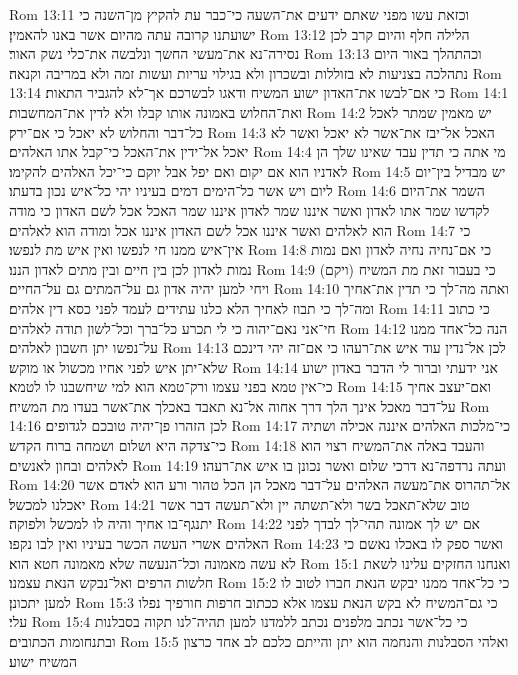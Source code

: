 Rom 13:11  וכזאת עשו מפני שאתם ידעים את־השעה כי־כבר עת להקיץ מן־השנה כי ישועתנו קרובה עתה מהיום אשר באנו להאמין׃
Rom 13:12  הלילה חלף והיום קרב לכן נסירה־נא את־מעשי החשך ונלבשה את־כלי נשק האור׃
Rom 13:13  וכהתהלך באור היום נתהלכה בצניעות לא בזוללות ובשכרון ולא בגילוי עריות ועשות זמה ולא במריבה וקנאה׃
Rom 13:14  כי אם־לבשו את־האדון ישוע המשיח ודאגו לבשרכם אך־לא להגביר התאות׃
Rom 14:1  ואת־החלוש באמונה אותו קבלו ולא לדין את־המחשבות׃
Rom 14:2  יש מאמין שמתר לאכל כל־דבר והחלוש לא יאכל כי אם־ירק׃
Rom 14:3  האכל אל־יבז את־אשר לא יאכל ואשר לא יאכל אל־ידין את־האכל כי־קבל אתו האלהים׃
Rom 14:4  מי אתה כי תדין עבד שאינו שלך הן לאדניו הוא אם יקום ואם יפל אבל יוקם כי־יכל האלהים להקימו׃
Rom 14:5  יש מבדיל בין־יום ליום ויש אשר כל־הימים דמים בעיניו יהי כל־איש נכון בדעתו׃
Rom 14:6  השמר את־היום לקדשו שמר אתו לאדון ואשר איננו שמר לאדון איננו שמר האכל אכל לשם האדון כי מודה הוא לאלהים ואשר איננו אכל לשם האדון איננו אכל ומודה הוא לאלהים׃
Rom 14:7  כי אין־איש ממנו חי לנפשו ואין איש מת לנפשו׃
Rom 14:8  כי אם־נחיה נחיה לאדון ואם נמות נמות לאדון לכן בין חיים ובין מתים לאדון הננו׃
Rom 14:9  כי בעבור זאת מת המשיח (ויקם) ויחי למען יהיה אדון גם על־המתים גם על־החיים׃
Rom 14:10  ואתה מה־לך כי תדין את־אחיך ומה־לך כי תבוז לאחיך הלא כלנו עתידים לעמד לפני כסא דין אלהים׃
Rom 14:11  כי כתוב חי־אני נאם־יהוה כי לי תכרע כל־ברך וכל־לשון תודה לאלהים׃
Rom 14:12  הנה כל־אחד ממנו על־נפשו יתן חשבון לאלהים׃
Rom 14:13  לכן אל־נדין עוד איש את־רעהו כי אם־זה יהי דינכם שלא־יתן איש לפני אחיו מכשול או מוקש׃
Rom 14:14  אני ידעתי וברור לי הדבר באדון ישוע כי־אין טמא בפני עצמו ורק־טמא הוא למי שיחשבנו לו לטמא׃
Rom 14:15  ואם־יעצב אחיך על־דבר מאכל אינך הלך דרך אחוה אל־נא תאבד באכלך את־אשר בעדו מת המשיח׃
Rom 14:16  לכן הזהרו פן־יהיה טובכם לגדופים׃
Rom 14:17  כי־מלכות האלהים איננה אכילה ושתיה כי־צדקה היא ושלום ושמחה ברוח הקדש׃
Rom 14:18  והעבד באלה את־המשיח רצוי הוא לאלהים ובחון לאנשים׃
Rom 14:19  ועתה נרדפה־נא דרכי שלום ואשר נכונן בו איש את־רעהו׃
Rom 14:20  אל־תהרוס את־מעשה האלהים על־דבר מאכל הן הכל טהור ורע הוא לאדם אשר יאכלנו למכשל׃
Rom 14:21  טוב שלא־תאכל בשר ולא־תשתה יין ולא־תעשה דבר אשר יתנגף־בו אחיך והיה לו למכשל ולפוקה׃
Rom 14:22  אם יש לך אמונה תהי־לך לבדך לפני האלהים אשרי העשה הכשר בעיניו ואין לבו נקפו׃
Rom 14:23  ואשר ספק לו באכלו נאשם כי לא עשה מאמונה וכל־הנעשה שלא מאמונה חטא הוא׃
Rom 15:1  ואנחנו החזקים עלינו לשאת חלשות הרפים ואל־נבקש הנאת עצמנו׃
Rom 15:2  כי כל־אחד ממנו יבקש הנאת חברו לטוב לו למען יתכונן׃
Rom 15:3  כי גם־המשיח לא בקש הנאת עצמו אלא ככתוב חרפות חורפיך נפלו עלי׃
Rom 15:4  כי כל־אשר נכתב מלפנים נכתב ללמדנו למען תהיה־לנו תקוה בסבלנות ובתנחומות הכתובים׃
Rom 15:5  ואלהי הסבלנות והנחמה הוא יתן והייתם כלכם לב אחד כרצון המשיח ישוע׃
